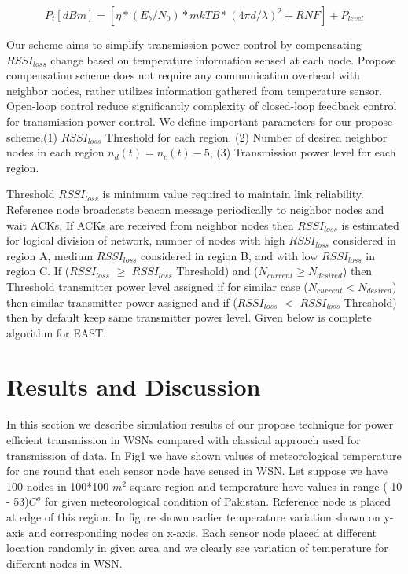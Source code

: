 \documentclass{article}
\begin{document}
 \begin{equation}
P_{t}[dBm]=[\eta*(E_{b}/N_{0})*mkTB*(4\pi d /\lambda )^2+RNF]+P_{level}
\end{equation}

 Our scheme aims to simplify transmission power control by compensating $RSSI_{loss}$ change based on temperature information sensed at each node. Propose compensation scheme does not require any communication overhead with neighbor nodes, rather utilizes information gathered from temperature sensor. Open-loop control reduce significantly complexity of closed-loop feedback control for transmission power control. We define important parameters for our propose scheme,(1) $RSSI_{loss}$ Threshold for each region. (2) Number of desired neighbor nodes in each region $n_{d}(t)=n_{c}(t)-5$, (3) Transmission power level for each region.


Threshold $RSSI_{loss}$ is minimum value required to maintain link reliability. Reference node broadcasts beacon message periodically to neighbor nodes and wait ACKs. If ACKs are received from neighbor nodes then $RSSI_{loss}$ is estimated for logical division of network, number of nodes with high $RSSI_{loss}$  considered in region A, medium $RSSI_{loss}$ considered in region B, and with low $RSSI_{loss}$ in region C. If ($RSSI_{loss}$ $\geq$ $RSSI_{loss}$ Threshold) and  ($N_{current}\geq  N_{desired}$) then Threshold transmitter power level assigned if  for similar case ($N_{current}<  N_{desired}$) then similar transmitter power assigned and if  ($RSSI_{loss}$ $<$ $RSSI_{loss}$  Threshold) then by default keep same transmitter power level. Given below is complete algorithm for EAST.


\section{Results and Discussion}
\label{sec:typestyle}

In this section we describe simulation results of our propose technique for power efficient transmission in WSNs compared with classical approach used for transmission of data. In Fig1 we have shown values of meteorological temperature for one round that each sensor node have sensed in WSN. Let suppose we have 100 nodes in 100*100 $m^{2}$ square region and temperature have values in range (-10 - 53)$C^{o}$  \cite{8} for given meteorological condition of Pakistan. Reference node is placed at edge of this region. In figure shown earlier temperature variation shown on y-axis and corresponding nodes on x-axis. Each sensor node placed at different location randomly in given area and we clearly see variation of temperature for different nodes in WSN.
\end{document}
